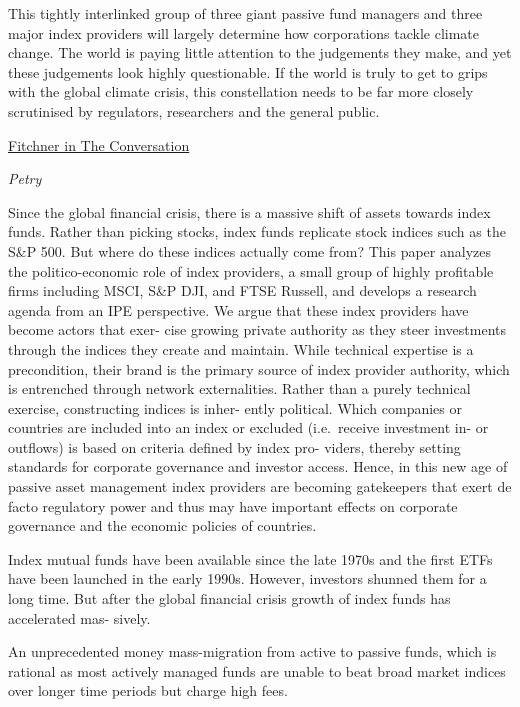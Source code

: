 \documentclass[
]{book}
\begin{document}
This tightly interlinked group of three giant passive fund managers and three major index providers will largely determine how corporations tackle climate change. The world is paying little attention to the judgements they make, and yet these judgements look highly questionable. If the world is truly to get to grips with the global climate crisis, this constellation needs to be far more closely scrutinised by regulators, researchers and the general public.

\href{https://theconversation.com/three-financial-firms-could-change-the-direction-of-the-climate-crisis-and-few-people-have-any-idea-131869}{Fitchner in The Conversation}

\emph{Petry}

Since the global financial crisis, there is a massive shift of assets towards index
funds. Rather than picking stocks, index funds replicate stock indices such as the
S\&P 500. But where do these indices actually come from? This paper analyzes the
politico-economic role of index providers, a small group of highly profitable firms
including MSCI, S\&P DJI, and FTSE Russell, and develops a research agenda from an
IPE perspective. We argue that these index providers have become actors that exer-
cise growing private authority as they steer investments through the indices they
create and maintain. While technical expertise is a precondition, their brand is the
primary source of index provider authority, which is entrenched through network
externalities. Rather than a purely technical exercise, constructing indices is inher-
ently political. Which companies or countries are included into an index or excluded
(i.e.~receive investment in- or outflows) is based on criteria defined by index pro-
viders, thereby setting standards for corporate governance and investor access.
Hence, in this new age of passive asset management index providers are becoming
gatekeepers that exert de facto regulatory power and thus may have important
effects on corporate governance and the economic policies of countries.

Index mutual funds have been available since the late 1970s and the first ETFs
have been launched in the early 1990s. However, investors shunned them for a long
time. But after the global financial crisis growth of index funds has accelerated mas-
sively.

An unprecedented
money mass-migration from active to passive funds, which is rational as most
actively managed funds are unable to beat broad market indices over longer time
periods but charge high fees.
\end{document}
